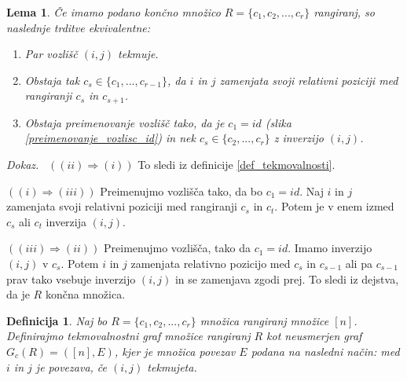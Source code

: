 \documentclass[a4paper, 12pt]{book}
\newtheorem{definicija}{Definicija}[chapter]
\newtheorem{lema}{Lema}[chapter]
\newenvironment{dokaz}{\emph{Dokaz.}\ }{\hspace{\fill}{$\Box$}}
\begin{document}
\begin{lema}
    Če imamo podano končno množico $R = \{ c_1, c_2, ..., c_r \}$ rangiranj, so naslednje trditve ekvivalentne:
    \begin{enumerate}[label=(\roman*)]
        \item Par vozlišč $(i, j)$ tekmuje.
        \item Obstaja tak $c_s \in \{ c_1, ..., c_{r-1} \}$, da $i$ in $j$ zamenjata svoji relativni poziciji med rangiranji $c_s$ in $c_{s+1}$.
        \item Obstaja preimenovanje vozlišč tako, da je $c_1 = id$ (slika \ref{preimenovanje_vozlisc_id}) in nek $c_s \in \{c_2, ..., c_r\}$ z inverzijo $(i, j)$.
    \end{enumerate}
\end{lema}
\begin{dokaz}
    $((ii) \Rightarrow (i))$ To sledi iz definicije \ref{def_tekmovalnosti}. 
    
    $((i) \Rightarrow (iii))$ Preimenujmo vozlišča tako, da bo $c_1 = id$. Naj $i$ in $j$ zamenjata svoji relativni poziciji med rangiranji $c_s$ in $c_t$. Potem je v enem izmed $c_s$ ali $c_t$ inverzija $(i, j)$. 
    
    $((iii) \Rightarrow (ii))$ Preimenujmo vozlišča, tako da $c_1 = id$. Imamo inverzijo $(i, j)$ v $c_s$. Potem $i$ in $j$ zamenjata relativno pozicijo med $c_s$ in $c_{s-1}$ ali pa $c_{s-1}$ prav tako vsebuje inverzijo $(i, j)$ in se zamenjava zgodi prej. To sledi iz dejstva, da je $R$ končna množica.
\end{dokaz}

\begin{definicija}
    Naj bo $R = \{ c_1, c_2, ..., c_r \}$ množica rangiranj množice $[n]$. Definirajmo tekmovalnostni graf množice rangiranj $R$ kot neusmerjen graf $G_c(R) = ([n], E)$, kjer je množica povezav $E$ podana na nasledni način: med $i$ in $j$ je povezava, če $(i, j)$ tekmujeta.
\end{definicija}
\end{document}
